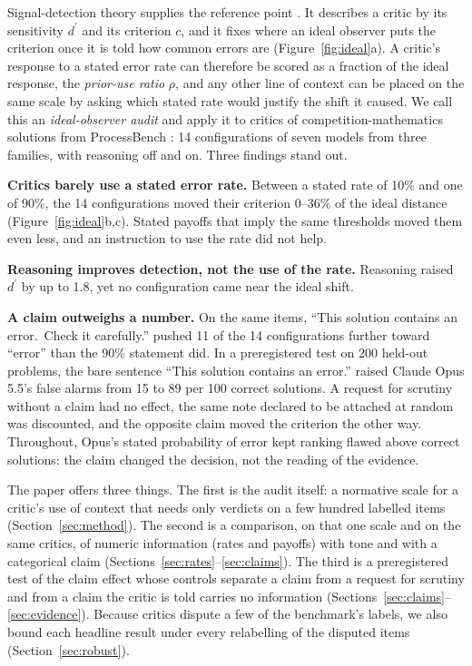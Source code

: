 \documentclass[letterpaper]{article} %
\newcommand{\dprime}{d^{\prime}}
\begin{document}
Signal-detection theory supplies the reference point \citep{green1966signal,macmillan2005detection}. It describes a critic by its sensitivity $\dprime$ and its criterion $c$, and it fixes where an ideal observer puts the criterion once it is told how common errors are (Figure~\ref{fig:ideal}a). A critic's response to a stated error rate can therefore be scored as a fraction of the ideal response, the \emph{prior-use ratio} $\rho$, and any other line of context can be placed on the same scale by asking which stated rate would justify the shift it caused. We call this an \emph{ideal-observer audit} and apply it to critics of competition-mathematics solutions from ProcessBench \citep{zheng2025processbench}: 14 configurations of seven models from three families, with reasoning off and on. Three findings stand out.

\textbf{Critics barely use a stated error rate.} Between a stated rate of 10\% and one of 90\%, the 14 configurations moved their criterion 0--36\% of the ideal distance (Figure~\ref{fig:ideal}b,c). Stated payoffs that imply the same thresholds moved them even less, and an instruction to use the rate did not help.

\textbf{Reasoning improves detection, not the use of the rate.} Reasoning raised $\dprime$ by up to 1.8, yet no configuration came near the ideal shift.

\textbf{A claim outweighs a number.} On the same items, ``This solution contains an error.\ Check it carefully.'' pushed 11 of the 14 configurations further toward ``error'' than the 90\% statement did. In a preregistered test on 200 held-out problems, the bare sentence ``This solution contains an error.'' raised Claude Opus 5.5's false alarms from 15 to 89 per 100 correct solutions. A request for scrutiny without a claim had no effect, the same note declared to be attached at random was discounted, and the opposite claim moved the criterion the other way. Throughout, Opus's stated probability of error kept ranking flawed above correct solutions: the claim changed the decision, not the reading of the evidence.

The paper offers three things. The first is the audit itself: a normative scale for a critic's use of context that needs only verdicts on a few hundred labelled items (Section~\ref{sec:method}). The second is a comparison, on that one scale and on the same critics, of numeric information (rates and payoffs) with tone and with a categorical claim (Sections~\ref{sec:rates}--\ref{sec:claims}). The third is a preregistered test of the claim effect whose controls separate a claim from a request for scrutiny and from a claim the critic is told carries no information (Sections~\ref{sec:claims}--\ref{sec:evidence}). Because critics dispute a few of the benchmark's labels, we also bound each headline result under every relabelling of the disputed items (Section~\ref{sec:robust}).
\end{document}
